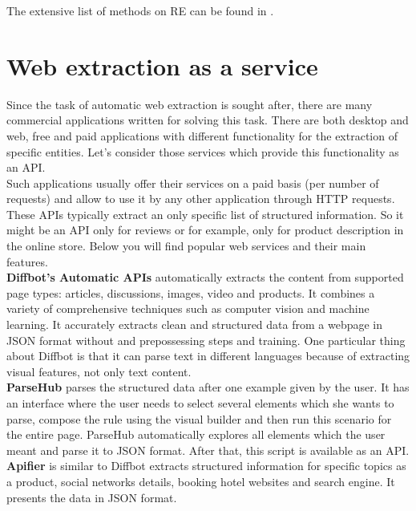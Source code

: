 The extensive list of methods on RE can be found in \cite{RegExtrSurvey}. 

\section{Web extraction as a service}

Since the task of automatic web extraction is sought after, there are many commercial applications written for solving this task. There are both desktop and web, free and paid applications with different functionality for the extraction of specific entities. Let's consider those services which provide this functionality as an API.\\

Such applications usually offer their services on a paid basis (per number of requests) and allow to use it by any other application through HTTP requests. These APIs typically extract an only specific list of structured information. So it might be an API only for reviews or for example, only for product description in the online store. Below you will find popular web services and their main features.\\

\noindent \textbf{Diffbot's Automatic APIs} \cite{Diffbot} automatically extracts the content from supported page types: articles, discussions, images, video and products. It combines a variety of comprehensive techniques such as computer vision and machine learning. It accurately extracts clean and structured data from a webpage in JSON format without and prepossessing steps and training. One particular thing about Diffbot is that it can parse text in different languages because of extracting visual features, not only text content.\\

\noindent\textbf{ParseHub}\cite{ParseHub} parses the structured data after one example given by the user. It has an interface where the user needs to select several elements which she wants to parse, compose the rule using the visual builder and then run this scenario for the entire page. ParseHub automatically explores all elements which the user meant and parse it to JSON format. After that, this script is available as an API.\\

\noindent\textbf{Apifier} \cite{Apifier} is similar to Diffbot extracts structured information for specific topics as a product, social networks details, booking hotel websites and search engine. It presents the data in JSON format.\\

